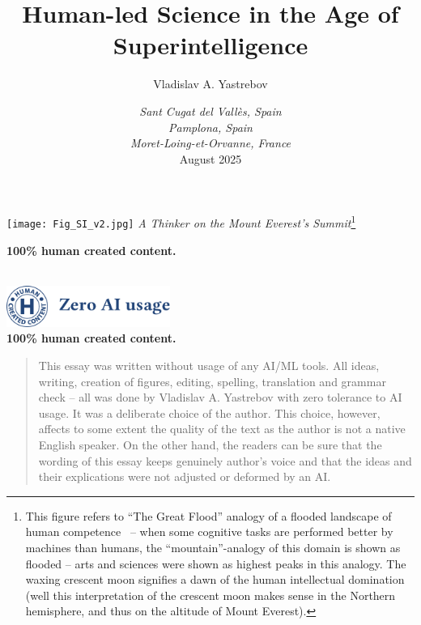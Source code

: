 \documentclass[a4paper,11pt]{article}
\title{Human-led Science in the Age of Superintelligence}
\author{Vladislav A. Yastrebov}
\date{\footnotesize\textit{Sant Cugat del Vall\`es, Spain}\\
\textit{Pamplona, Spain}\\
\textit{Moret-Loing-et-Orvanne, France}\\
August 2025}
\begin{document}
\maketitle

\thispagestyle{empty}
\begin{center}
    \texttt{[image: Fig\_SI\_v2.jpg]}
    \textit{A Thinker on the Mount Everest's Summit}\footnote{This figure refers to ``The Great Flood'' analogy of a flooded landscape of human competence~\parencite{moravec1988mind,moravec1998will} -- when some cognitive tasks are performed better by machines than humans, the ``mountain''-analogy of this domain is shown as flooded -- arts and sciences were shown as highest peaks in this analogy. The waxing crescent moon signifies a dawn of the human intellectual domination (well this interpretation of the crescent moon makes sense in the Northern hemisphere, and thus on the altitude of Mount Everest).}

    \vspace{0.5cm}
    \footnotesize 
    \textbf{100\% human created content.} 
\end{center}

    \newpage



\begin{center}
    $ $\\
    \vspace{4.5cm}
    \includegraphics[width=0.4\textwidth]{ai_usage.pdf}\\[1em]
    \footnotesize 
    \textbf{100\% human created content.} 
\end{center}
\vspace{-1em}
\footnotesize \noindent
\begin{quote}
This essay was written without usage of any AI/ML tools. All ideas, writing, creation of figures, editing, spelling, translation and grammar check -- all was done by Vladislav A. Yastrebov with zero tolerance to AI usage. It was a deliberate choice of the author. This choice, however, affects to some extent the quality of the text as the author is not a native English speaker. On the other hand, the readers can be sure that the wording of this essay keeps genuinely author's voice and that the ideas and their explications were not adjusted or deformed by an AI.
    
\end{quote}
\end{document}
